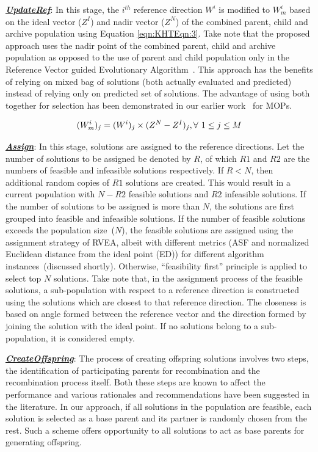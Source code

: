 \documentclass[twocolumn,10pt]{asme2ej}
\begin{document}
	\noindent \underline{\it \textbf{UpdateRef}}: In this stage, the $i^{th}$ reference direction $W^i$ is modified to $W^i_m$ based on the ideal vector ($Z^I$) and nadir vector ($Z^N$) of the combined parent, child and archive population using Equation \ref{eqn:KHTEqn:3}. Take note that  the proposed approach uses the nadir point of the combined parent, child and archive population as opposed to the use of parent and child population only in the Reference Vector guided Evolutionary Algorithm~\cite{KHTCheng2016many}. This approach has the benefits of relying on mixed bag of solutions (both actually evaluated and predicted) instead of relying only on predicted set of solutions. The advantage of using both together for selection has been demonstrated in our earlier work~\cite{bhattacharjee2016multiple} for MOPs.
	
	\begin{equation}\footnotesize
	(W^i_m)_j = (W^i)_j\times(Z^N - Z^I)_j, \forall~1\le j\le M
	\label{eqn:KHTEqn:3}
	\end{equation}
	
\noindent \underline{\it \textbf{Assign}}: In this stage, solutions are assigned to the reference directions. Let the number of solutions to be assigned be denoted by $R$, of which $R1$ and $R2$ are the numbers of feasible and infeasible solutions respectively. If $R < N$, then additional random copies of $R1$ solutions are created. This would result in a current population with $N-R2$ feasible solutions and $R2$ infeasible solutions. If the number of solutions to be assigned is more than $N$, the solutions are first grouped into feasible and infeasible solutions. If the number of feasible solutions exceeds the population size~($N$), the feasible solutions are assigned using the assignment strategy of RVEA, albeit with different metrics (ASF and normalized Euclidean distance from the ideal point (ED)) for different algorithm instances~(discussed shortly). Otherwise, ``feasibility first'' principle is applied to select top $N$ solutions. Take note that, in the assignment process of the feasible solutions, a sub-population with respect to a reference direction is constructed using the solutions which are closest to that reference direction. The closeness is based on angle formed between the reference vector and the direction formed by joining the solution with the ideal point. If no solutions belong to a sub-population, it is considered empty. 
	
\noindent \underline{\it \textbf{CreateOffspring}}: The process of creating offspring solutions involves two steps, the identification of participating parents for recombination and the recombination process itself. Both these steps are known to affect the performance and various rationales and recommendations have been suggested in the literature. In our approach, if all solutions in the population are feasible, each solution is selected as a base parent and its partner is randomly chosen from the rest. Such a scheme offers opportunity to all solutions to act as base parents for generating offspring.
	
\end{document}
